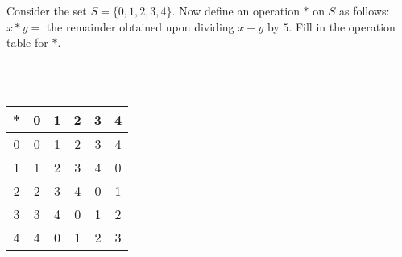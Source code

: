 Consider the set $S=\{0,1,2,3,4\}$. Now define an operation $*$ on $S$ as follows: $x*y=$ the remainder
obtained upon dividing $x+y$ by $5$. Fill in the operation table for $*$.\\\\

\begin{solution}\renewcommand{\qedsymbol}{}\ \\
    \begin{center}
        \begin{tabular}{ c | c c c c c }
            * & 0 & 1 & 2 & 3 & 4\\
            \hline 
            0 & 0 & 1 & 2 & 3 & 4\\  
            1 & 1 & 2 & 3 & 4 & 0\\
            2 & 2 & 3 & 4 & 0 & 1\\
            3 & 3 & 4 & 0 & 1 & 2\\
            4 & 4 & 0 & 1 & 2 & 3\\
        \end{tabular}
    \end{center}
\end{solution}
